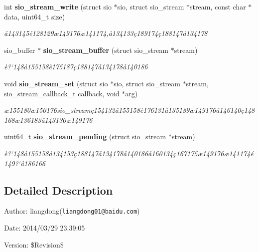 \begin{CompactItemize}
int {\bf sio\_\-stream\_\-write} (struct sio $\ast$sio, struct sio\_\-stream $\ast$stream, const char $\ast$data, uint64\_\-t size)
\begin{CompactList}\small\item\em \aa{}143145\'{e}128129\ae{}149176\ae{}141174,\aa{}134133\c{c}189174\c{c}188147\aa{}134178 \item\end{CompactList}\item 
sio\_\-buffer $\ast$ {\bf sio\_\-stream\_\-buffer} (struct sio\_\-stream $\ast$stream)
\begin{CompactList}\small\item\em \`{e}?`148\aa{}155158\`{e}175187\c{c}188147\aa{}134178\aa{}140186 \item\end{CompactList}\item 
void {\bf sio\_\-stream\_\-set} (struct sio $\ast$sio, struct sio\_\-stream $\ast$stream, sio\_\-stream\_\-callback\_\-t callback, void $\ast$arg)
\begin{CompactList}\small\item\em \ae{}155180\ae{}150176sio\_\-stream\c{c}154132\aa{}155158\`{e}176131\aa{}135189\ae{}149176\aa{}146140\c{c}148168\ae{}136183\aa{}143130\ae{}149176 \item\end{CompactList}\item 
uint64\_\-t {\bf sio\_\-stream\_\-pending} (struct sio\_\-stream $\ast$stream)
\begin{CompactList}\small\item\em \`{e}?`148\aa{}155158\aa{}134153\c{c}188147\aa{}134178\aa{}140186\aa{}160134\c{c}167175\ae{}149176\ae{}141174\'{e}149?`\aa{}186166 \item\end{CompactList}\end{CompactItemize}


\subsection{Detailed Description}
\begin{Desc}
\item[Author:]liangdong({\tt liangdong01@baidu.com}) \end{Desc}
\begin{Desc}
\item[Date:]2014/03/29 23:39:05 \end{Desc}
\begin{Desc}
\item[Version:]\$Revision\$ \end{Desc}


